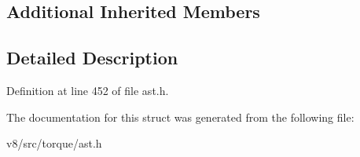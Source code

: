 \subsection*{Additional Inherited Members}


\subsection{Detailed Description}


Definition at line 452 of file ast.\+h.



The documentation for this struct was generated from the following file\+:\begin{DoxyCompactItemize}
\item 
v8/src/torque/ast.\+h\end{DoxyCompactItemize}
